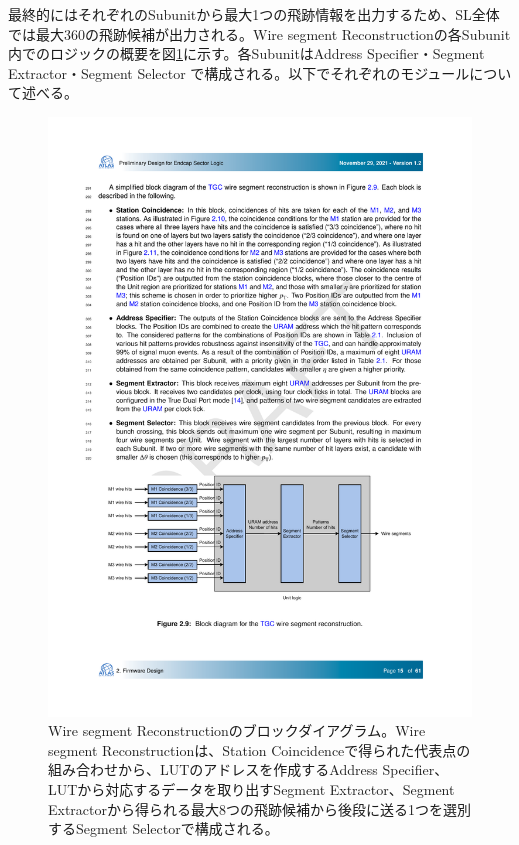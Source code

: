 最終的にはそれぞれのSubunitから最大1つの飛跡情報を出力するため、SL全体では最大360の飛跡候補が出力される。Wire segment Reconstructionの各Subunit内でのロジックの概要を図\ref{SegReco_wire}に示す。各SubunitはAddress Specifier・Segment Extractor・Segment Selector で構成される。以下でそれぞれのモジュールについて述べる。

\begin{figure} 
\centering
\includegraphics[width=16cm]{fig/SL/SegReco_wire.pdf}
\caption[Wire segment Reconstructionのブロックダイアグラム]{Wire segment Reconstructionのブロックダイアグラム\cite{SLPDR}。Wire segment Reconstructionは、Station Coincidenceで得られた代表点の組み合わせから、LUTのアドレスを作成するAddress Specifier、LUTから対応するデータを取り出すSegment Extractor、Segment Extractorから得られる最大8つの飛跡候補から後段に送る1つを選別するSegment Selectorで構成される。}
\label{SegReco_wire}
\end{figure}

